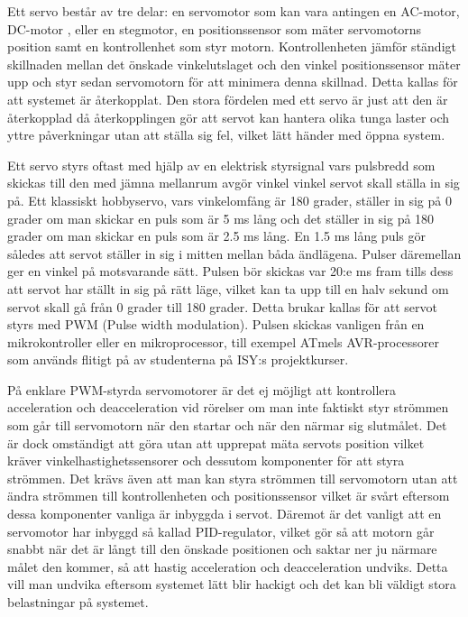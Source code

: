 \documentclass[a4paper,12pt]{article}
\begin{document}
Ett servo består av tre delar: en servomotor som kan vara antingen en AC-motor, DC-motor , eller en stegmotor, en positionssensor som mäter servomotorns position samt en kontrollenhet som styr motorn.  Kontrollenheten jämför ständigt skillnaden mellan det önskade vinkelutslaget och den vinkel positionssensor mäter upp och styr sedan servomotorn för att minimera denna skillnad. Detta kallas för att systemet är återkopplat. Den stora fördelen med ett servo är just att den är återkopplad då återkopplingen gör att servot kan hantera olika tunga laster och yttre påverkningar utan att ställa sig fel, vilket lätt händer med öppna system. 
 
Ett servo styrs oftast  med hjälp av en elektrisk styrsignal vars pulsbredd som skickas till den med jämna mellanrum avgör vinkel vinkel servot skall ställa in sig på. Ett klassiskt hobbyservo, vars vinkelomfång är 180 grader, ställer in sig på 0 grader om man skickar en puls som är 5 ms lång och det ställer in sig på 180 grader om man skickar en puls som är 2.5 ms lång. En 1.5 ms lång puls gör således att servot ställer in sig i mitten mellan båda ändlägena. Pulser däremellan ger en vinkel på motsvarande sätt. Pulsen bör skickas var 20:e ms fram tills dess att servot har ställt in sig på rätt läge, vilket kan ta upp till en halv sekund om servot skall gå från 0 grader till 180 grader. Detta brukar kallas för att servot styrs med PWM (Pulse width modulation). Pulsen skickas vanligen från en mikrokontroller eller en mikroprocessor, till exempel ATmels AVR-processorer som används flitigt på av studenterna på ISY:s projektkurser.
 
På enklare PWM-styrda servomotorer är det ej möjligt att kontrollera acceleration och deacceleration vid rörelser om man inte faktiskt styr strömmen som går till servomotorn när den startar och när den närmar sig slutmålet. Det är dock omständigt att göra utan att upprepat mäta servots position vilket kräver vinkelhastighetssensorer och dessutom komponenter för att styra strömmen. Det krävs även att man kan styra strömmen till servomotorn utan att ändra strömmen till kontrollenheten och positionssensor vilket är svårt eftersom dessa komponenter vanliga är inbyggda i servot. Däremot är det vanligt att en servomotor har inbyggd så kallad PID-regulator, vilket gör så att motorn går snabbt när det är långt till den önskade positionen och saktar ner ju närmare målet den kommer, så att hastig acceleration och deacceleration undviks. Detta vill man undvika eftersom systemet lätt blir hackigt och det kan bli väldigt stora belastningar på systemet. 
 
\end{document}
